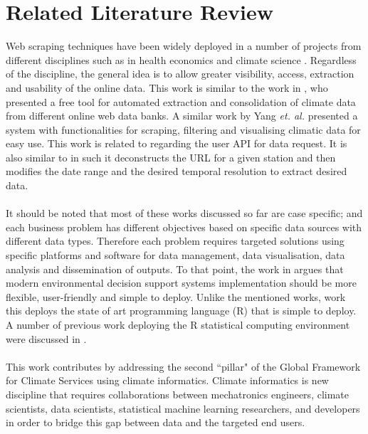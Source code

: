\documentclass[a4paper, 10pt, conference]{ieeeconf}      %
\begin{document}
\section{Related Literature Review}
\label{LR}
\noindent
 	Web scraping techniques have been widely deployed in a number of projects from different disciplines such as in health economics \cite{smith2020making} and climate science \cite{yang2010development}. Regardless of the discipline, the general idea is to allow greater visibility, access, extraction and usability of the online data.  This work is similar to the work in \cite{BONIFACIO201513}, who presented a free tool for automated extraction and consolidation of climate data from different online web data banks.   A similar work by Yang \emph{et. al.} \cite{yang2010development} presented a system with functionalities for scraping, filtering and visualising climatic data for easy use.   This work is related to \cite{sitterson2020demonstration} regarding the user API for data request.
 	It is also similar to \cite{BONIFACIO201513} in such it deconstructs the URL for a given station and then modifies the date range and the desired temporal resolution to extract desired data. 
\\
\\
It should be noted that   most of these works discussed so far are case specific; and  each business problem has different objectives based on specific data sources with different data types. 
 	Therefore each problem requires targeted solutions using specific platforms and software for data management, data visualisation, data analysis and dissemination of outputs. To that point, the work in \cite{li2020towards} argues that modern environmental decision support systems implementation should be more flexible, user-friendly and simple to deploy. 
 Unlike the mentioned works,  work this deploys the state of art programming language (R) that is simple to deploy.
 A number of previous work deploying the R statistical computing environment were discussed in \cite{li2020towards}. \\
 	\\
     This work contributes by addressing the second ``pillar" of the Global Framework for Climate Services \cite{VAUGHAN201665} using climate informatics. Climate informatics \cite{lyubchich2019statistics,GIBERT20183}
 is new discipline that requires    collaborations between mechatronics engineers, climate scientists, data scientists,
statistical machine learning researchers, and developers in order to bridge this gap between data and
the targeted end users.
     
\end{document}
